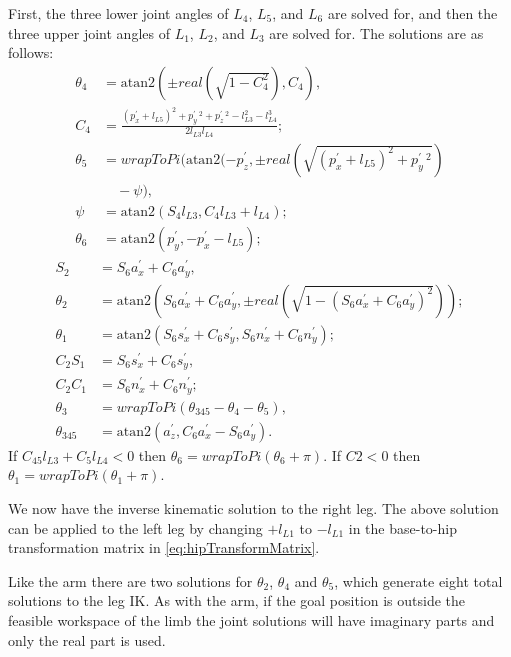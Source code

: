 \documentclass[letterpaper, 10 pt, conference]{IEEEtran}
\providecommand{\atan}{\mathrm{atan2}} %
\begin{document}
First, the three lower joint angles of $L_4$, $L_5$, and $L_6$ are solved for, and then the three upper joint angles of $L_1$, $L_2$, and $L_3$ are solved for. The solutions are as follows:
\begin{align}
  \theta_4 &= \atan(\pm real(\sqrt{1-C_4^2}), C_4), \nonumber \\
  C_4 &= \frac{(p_x^\prime + l_{L5})^2 + p_y^\prime\,^2 + p_z^\prime\,^2 - l_{L3}^2 - l_{L4}^3}{2l_{L3}l_{L4}}; \nonumber \\
  \theta_5 &= wrapToPi(\atan(-p_z^\prime, \pm real(\sqrt{(p_x^\prime + l_{L5})^2 + p_y^\prime\,^2}) \nonumber \\
  &\quad- \psi),  \nonumber \\
  \psi &= \atan(S_4l_{L3}, C_4l_{L3}+l_{L4}); \nonumber \\
  \theta_6 &= \atan(p_y^\prime, -p_x^\prime-l_{L5});  \nonumber
\end{align}
\begin{align}
  S_2 &= S_6a_x^\prime + C_6a_y^\prime,  \nonumber \\
  \theta_2 &= \atan(S_6a_x^\prime + C_6a_y^\prime, \pm real(\sqrt{1 - (S_6a_x^\prime + C_6a_y^\prime)^2})); \nonumber \\
  \theta_1 &= \atan(S_6s_x^\prime + C_6s_y^\prime, S_6n_x^\prime + C_6n_y^\prime); \nonumber  \\
  C_2S_1 &= S_6s_x^\prime + C_6s_y^\prime, \nonumber \\
  C_2C_1 &= S_6n_x^\prime + C_6n_y^\prime; \nonumber \\
  \theta_3 &= wrapToPi(\theta_{345} - \theta_4 - \theta_5), \nonumber  \\
  \theta_{345} &= \atan(a_z^\prime, C_6a_x^\prime - S_6a_y^\prime). \nonumber
\end{align}
If $C_{45} l_{L3} + C_5 l_{L4} < 0$ then $\theta_6 = wrapToPi(\theta_6 + \pi)$.
If $C2 < 0$ then $\theta_1 = wrapToPi(\theta_1 + \pi)$.

We now have the inverse kinematic solution to the right leg. The above solution can be applied to the left leg by changing $+l_{L1}$ to $-l_{L1}$ in the base-to-hip transformation matrix in \eqref{eq:hipTransformMatrix}.

Like the arm there are two solutions for $\theta_2$, $\theta_4$ and $\theta_5$, which generate eight total solutions to the leg IK. As with the arm, if the goal position is outside the feasible workspace of the limb the joint solutions will have imaginary parts and only the real part is used.
\end{document}

